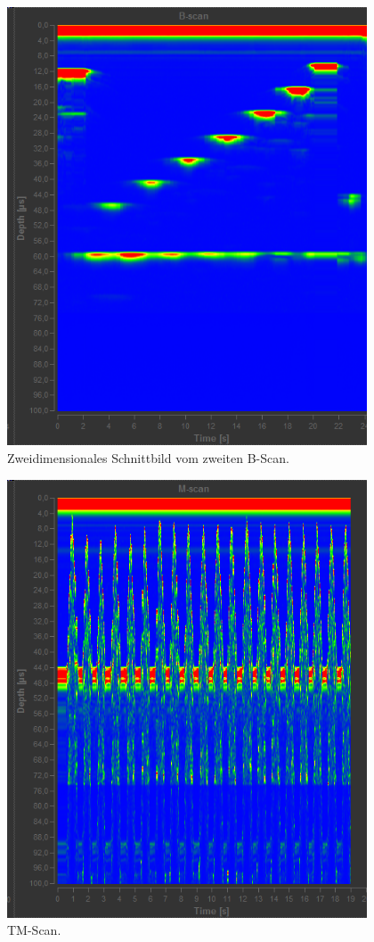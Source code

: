 \begin{figure}
  \centering
  \includegraphics[height=13cm]{Daten/B-Scan2.png}
  \caption{Zweidimensionales Schnittbild vom zweiten B-Scan.}
  \label{fig:BScan2}
\end{figure}

\begin{figure}
  \centering
  \includegraphics[height=13cm]{Daten/TM-Scan.png}
  \caption{TM-Scan.}
  \label{fig:TMScan}
\end{figure}

